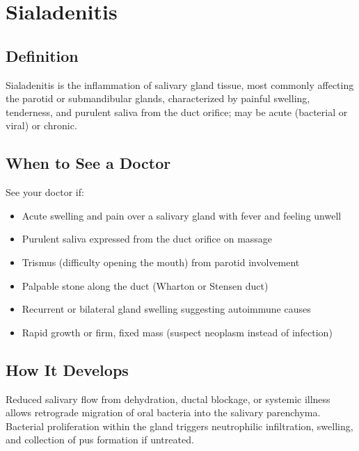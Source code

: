 \chapter{Sialadenitis}

\section*{Definition}
Sialadenitis is the inflammation of salivary gland tissue, most commonly affecting the parotid or submandibular glands, characterized by painful swelling, tenderness, and purulent saliva from the duct orifice; may be acute (bacterial or viral) or chronic.

\section*{When to See a Doctor}
See your doctor if:
\begin{itemize}
  \item Acute swelling and pain over a salivary gland with fever and feeling unwell
  \item Purulent saliva expressed from the duct orifice on massage
  \item Trismus (difficulty opening the mouth) from parotid involvement
  \item Palpable stone along the duct (Wharton or Stensen duct)
  \item Recurrent or bilateral gland swelling suggesting autoimmune causes
  \item Rapid growth or firm, fixed mass (suspect neoplasm instead of infection)
\end{itemize}

\section*{How It Develops}
Reduced salivary flow from dehydration, ductal blockage, or systemic illness allows retrograde migration of oral bacteria into the salivary parenchyma. Bacterial proliferation within the gland triggers neutrophilic infiltration, swelling, and collection of pus formation if untreated.

